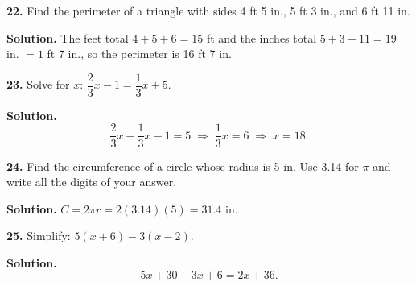 \documentclass{ximera}
\begin{document}
\begin{problem}

\textbf{22.} Find the perimeter of a triangle with sides 4 ft 5 in., 5 ft 3 in., and
6 ft 11 in.

\begin{hint}
\textbf{Solution.} The feet total $4+5+6=15$ ft and the inches total
$5+3+11=19$ in. $=1$ ft 7 in., so the perimeter is 16 ft 7 in.
\end{hint}
\end{problem}

\begin{problem}

\textbf{23.} Solve for $x$: $\dfrac{2}{3}x-1=\dfrac{1}{3}x+5$.

\begin{hint}
\textbf{Solution.}
\[
  \frac{2}{3}x-\frac{1}{3}x-1=5 \;\Longrightarrow\; \frac{1}{3}x=6 \;\Longrightarrow\; x=18 .
\]
\end{hint}
\end{problem}

\begin{problem}

\textbf{24.} Find the circumference of a circle whose radius is 5 in. Use 3.14 for $\pi$
and write all the digits of your answer.

\begin{hint}
\textbf{Solution.} $C=2\pi r=2(3.14)(5)=31.4$ in.
\end{hint}
\end{problem}

\begin{problem}

\textbf{25.} Simplify: $5(x+6)-3(x-2)$.

\begin{hint}
\textbf{Solution.}
\[
  5x+30-3x+6 = 2x+36 .
\]
\end{hint}
\end{problem}
\end{document}
